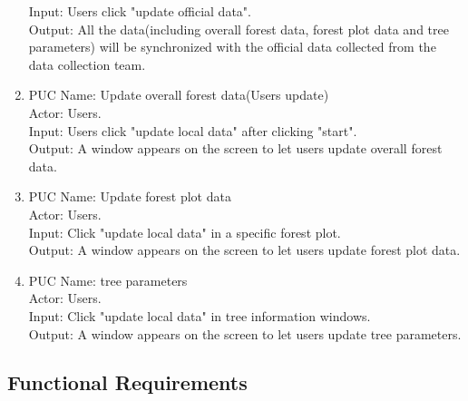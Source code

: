 \documentclass{article}
\begin{document}
\begin{enumerate}
    Input: Users click "update official data".\\
    Output: All the data(including overall forest data, forest plot data and tree 
    parameters) will be synchronized with the official data collected from the 
    data collection team.
    \item PUC Name: Update overall forest data(Users update)\\
    Actor: Users.\\
    Input: Users click "update local data" after clicking "start".\\
    Output: A window appears on the screen to let users update overall
    forest data.
    \item PUC Name: Update forest plot data\\
    Actor: Users.\\
    Input: Click "update local data" in a specific forest plot.\\
    Output:  A window appears on the screen to let users update
    forest plot data.
    \item PUC Name: tree parameters\\
    Actor: Users.\\
    Input: Click "update local data" in tree information windows.\\
    Output:  A window appears on the screen to let users update tree 
    parameters.
\end{enumerate}



\subsection{Functional Requirements}
\end{document}
